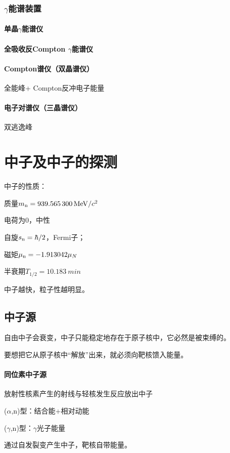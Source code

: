 \subsubsection[\textit{\textgamma}能谱装置]{$\gamma$能谱装置}
\paragraph{单晶$\gamma$能谱仪}

\paragraph{全吸收反Compton $\gamma$能谱仪}

\paragraph{Compton谱仪（双晶谱仪）}
全能峰+ Compton反冲电子能量
\paragraph{电子对谱仪（三晶谱仪）}
双逃逸峰
\clearpage
\section{中子及中子的探测}
中子的性质：
\begin{compactitem}
	\item 质量$m_\mathrm n=\SI{939.565300}{MeV}/c^2$
	\item 电荷为0，中性
	\item 自旋$s_\mathrm n=\hbar/2$，Fermi子； 
	\item 磁矩$\mu_\mathrm n=-1.913042\mu_N$
	\item 半衰期$T_{1/2}=\SI{10.183}{min}$
\end{compactitem}
中子越快，粒子性越明显。
\subsection{中子源}
自由中子会衰变，中子只能稳定地存在于原子核中，它必然是被束缚的。

要想把它从原子核中“解放”出来，就必须向靶核馈入能量。
\paragraph{同位素中子源}放射性核素产生的射线与轻核发生反应放出中子
\begin{compactitem}
	\item ($\alpha$,n)型：结合能+相对动能
	\item ($\gamma$,n)型：$\gamma$光子能量 
\end{compactitem}
通过自发裂变产生中子，靶核自带能量。

